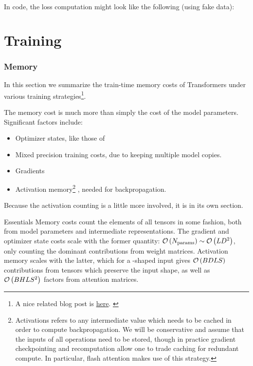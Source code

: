 \documentclass[11pt]{article}
\begin{document}
In 
code, the loss computation might look like the following (using fake data):

\part{Training}

\section{Memory \label{sec_memory_training}}

In this section we summarize the train-time memory costs of Transformers under various training
strategies\footnote{A nice related blog post is \href{https://blog.eleuther.ai/transformer-math/}{here}. \label{foot_eleuther_math_101} }.

The memory cost is much more than simply the cost of the model
parameters. Significant factors include:
\begin{itemize}
\item Optimizer states, like those of 
\item Mixed precision training costs, due to keeping multiple model copies.
\item Gradients
\item Activation memory\footnote{Activations refers to any intermediate value which needs to be
    cached in order to compute backpropagation. We will be conservative and assume that the inputs
of all operations need to be stored, though in practice gradient checkpointing and recomputation
allow one to trade caching for redundant compute. In particular, flash attention
\cite{dao2022flashattention} makes use of this strategy.} , needed for backpropagation.
\end{itemize}
Because the activation counting is a little more involved, it is in its own section.


\begin{nicebox}{Essentials}
Memory costs count the elements of all tensors in some fashion, both from model parameters and
intermediate representations. The gradient and optimizer state costs scale with the former quantity:
$ \mathcal{O} \left ( N _{ {\rm params}  } \right ) \sim \mathcal{O} \left ( L D ^{ 2 } \right )$, only counting
the dominant contributions from weight matrices. Activation memory scales with the latter,
which for a -shaped input gives $ \mathcal{O} \left ( BDLS  \right ) $ contributions
from tensors which preserve the input shape, as well as $ \mathcal{O} \left( BHLS ^{ 2 } \right)  $
factors from attention matrices.
\end{nicebox}
\end{document}
